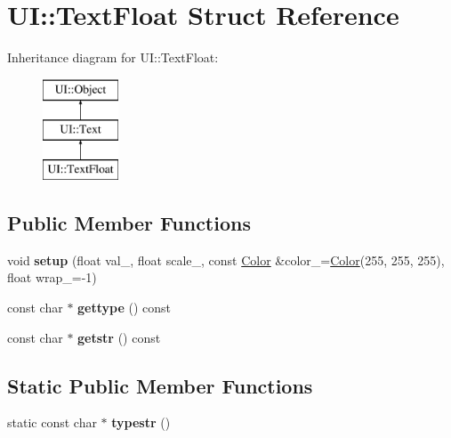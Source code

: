 \hypertarget{struct_u_i_1_1_text_float}{}\section{UI\+:\+:Text\+Float Struct Reference}
\label{struct_u_i_1_1_text_float}
Inheritance diagram for UI\+:\+:Text\+Float\+:\begin{figure}[H]
\begin{center}
\leavevmode
\includegraphics[height=3.000000cm]{struct_u_i_1_1_text_float}
\end{center}
\end{figure}
\subsection*{Public Member Functions}
\begin{DoxyCompactItemize}
\item 
\mbox{\label{struct_u_i_1_1_text_float_a02656ac0c11c8fe156c18810a20c23ac}} 
void {\bfseries setup} (float val\+\_\+, float scale\+\_, const \hyperlink{struct_u_i_1_1_color}{Color} \&color\+\_\+=\hyperlink{struct_u_i_1_1_color}{Color}(255, 255, 255), float wrap\+\_\+=-\/1)
\item 
\mbox{\label{struct_u_i_1_1_text_float_ab2089ca0e85c554d6d60d3c0674a0caa}} 
const char $\ast$ {\bfseries gettype} () const
\item 
\mbox{\label{struct_u_i_1_1_text_float_a319757e8a0b3b893fbab250cf752f4f5}} 
const char $\ast$ {\bfseries getstr} () const
\end{DoxyCompactItemize}
\subsection*{Static Public Member Functions}
\begin{DoxyCompactItemize}
\item 
\mbox{\label{struct_u_i_1_1_text_float_a709c9ed54746b7eeefd0ccf74f35d931}} 
static const char $\ast$ {\bfseries typestr} ()
\end{DoxyCompactItemize}
